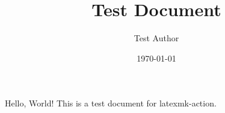 \documentclass{article}
\title{Test Document}
\author{Test Author}
\date{\today}
\begin{document}
\maketitle
Hello, World! This is a test document for latexmk-action.
\end{document}
